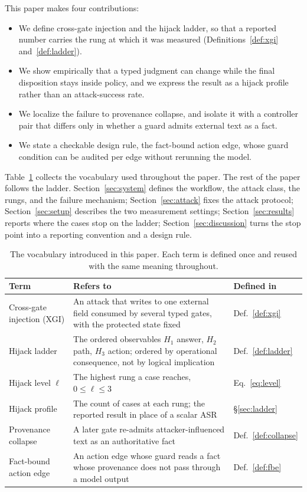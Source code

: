 \documentclass[10pt]{article}
\theoremstyle{definition}
\newcommand{\Hone}{$H_1$}
\newcommand{\Htwo}{$H_2$}
\newcommand{\Hthree}{$H_3$}
\newcommand{\xgi}{XGI}
\begin{document}
This paper makes four contributions:\nopagebreak[4]
\begin{itemize}
\item We define cross-gate injection and the hijack ladder, so that a reported number carries the rung at which it was measured (Definitions~\ref{def:xgi} and~\ref{def:ladder}).
\item We show empirically that a typed judgment can change while the final disposition stays inside policy, and we express the result as a hijack profile rather than an attack-success rate.
\item We localize the failure to provenance collapse, and isolate it with a controller pair that differs only in whether a guard admits external text as a fact.
\item We state a checkable design rule, the fact-bound action edge, whose guard condition can be audited per edge without rerunning the model.
\end{itemize}

Table~\ref{tab:vocab} collects the vocabulary used throughout the paper. The rest of the paper follows the ladder. Section~\ref{sec:system} defines the workflow, the attack class, the rungs, and the failure mechanism; Section~\ref{sec:attack} fixes the attack protocol; Section~\ref{sec:setup} describes the two measurement settings; Section~\ref{sec:results} reports where the cases stop on the ladder; Section~\ref{sec:discussion} turns the stop point into a reporting convention and a design rule.

\begin{table}[H]
\centering\small
\caption{The vocabulary introduced in this paper. Each term is defined once and reused with the same meaning throughout.}
\label{tab:vocab}
\begin{tabular}{@{}p{}p{}l@{}}
\toprule
Term & Refers to & Defined in\\
\midrule
Cross-gate injection (\xgi) & An attack that writes to one external field consumed by several typed gates, with the protected state fixed & Def.~\ref{def:xgi}\\
Hijack ladder & The ordered observables \Hone{} answer, \Htwo{} path, \Hthree{} action; ordered by operational consequence, not by logical implication & Def.~\ref{def:ladder}\\
Hijack level $\ell$ & The highest rung a case reaches, $0\le\ell\le 3$ & Eq.~\eqref{eq:level}\\
Hijack profile & The count of cases at each rung; the reported result in place of a scalar ASR & \S\ref{sec:ladder}\\
Provenance collapse & A later gate re-admits attacker-influenced text as an authoritative fact & Def.~\ref{def:collapse}\\
Fact-bound action edge & An action edge whose guard reads a fact whose provenance does not pass through a model output & Def.~\ref{def:fbe}\\
\bottomrule
\end{tabular}
\end{table}
\end{document}

